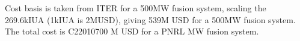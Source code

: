 Cost basis is taken from ITER for a 500MW fusion system, scaling the 269.6kIUA (1kIUA is 2MUSD), giving 539M USD for a 500MW fusion system. The total cost is C22010700 M USD for a PNRL MW fusion system.






